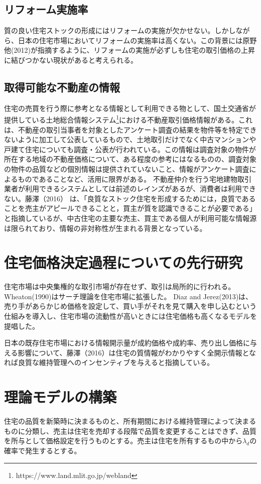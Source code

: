 \documentclass[a4paper,fontsize=11pt,report,notitlepage,line_length=38zw,number_of_lines=40]{jlreq}
\begin{document}
\section{リフォーム実施率}
質の良い住宅ストックの形成にはリフォームの実施が欠かせない。しかしながら、日本の住宅市場においてリフォームの実施率は高くない。この背景には原野他(2012)\cite{harano2013}が指摘するように、リフォームの実施が必ずしも住宅の取引価格の上昇に結びつかない現状があると考えられる。


\section{取得可能な不動産の情報}
住宅の売買を行う際に参考となる情報として利用できる物として、国土交通省が提供している土地総合情報システム\footnote{https://www.land.mlit.go.jp/webland}における不動産取引価格情報がある。これは、不動産の取引当事者を対象としたアンケート調査の結果を物件等を特定できないように加工して公表しているもので、土地取引だけでなく中古マンションや戸建て住宅についても調査・公表が行われている。この情報は調査対象の物件が所在する地域の不動産価格について、ある程度の参考にはなるものの、調査対象の物件の品質などの個別情報は提供されていないこと、情報がアンケート調査によるものであることなど、活用に限界がある。
不動産仲介を行う宅地建物取引業者が利用できるシステムとしては前述のレインズがあるが、消費者は利用できない。藤澤（2016）\cite{fujisawa2016}
は、「良質なストック住宅を形成するためには，良質であることを売主がアピールできることと，買主が質を認識できることが必要である」と指摘しているが、中古住宅の主要な売主、買主である個人が利用可能な情報源は限られており、情報の非対称性が生まれる背景となっている。


\chapter{住宅価格決定過程についての先行研究}
住宅市場は中央集権的な取引市場が存在せず、取引は局所的に行われる。
Wheaton(1990)はサーチ理論を住宅市場に拡張した。
Diaz and Jerez(2013)は、売り手があらかじめ価格を設定して、買い手がそれを見て購入を申し込むという仕組みを導入し、住宅市場の流動性が高いときには住宅価格も高くなるモデルを提唱した。

日本の既存住宅市場における情報開示量が成約価格や成約率、売り出し価格に与える影響について、藤澤（2016）\cite{fujisawa2016}は住宅の質情報がわかりやすく全開示情報となれば良質な維持管理へのインセンティブを与えると指摘している。

\chapter{理論モデルの構築}
住宅の品質を新築時に決まるものと、所有期間における維持管理によって決まるものに分類し、売主は住宅を売却する段階で品質を変更することはできず、品質を所与として価格設定を行うものとする。売主は住宅を所有するもの中から$\lambda_{d}$の確率で発生するとする。
\end{document}
